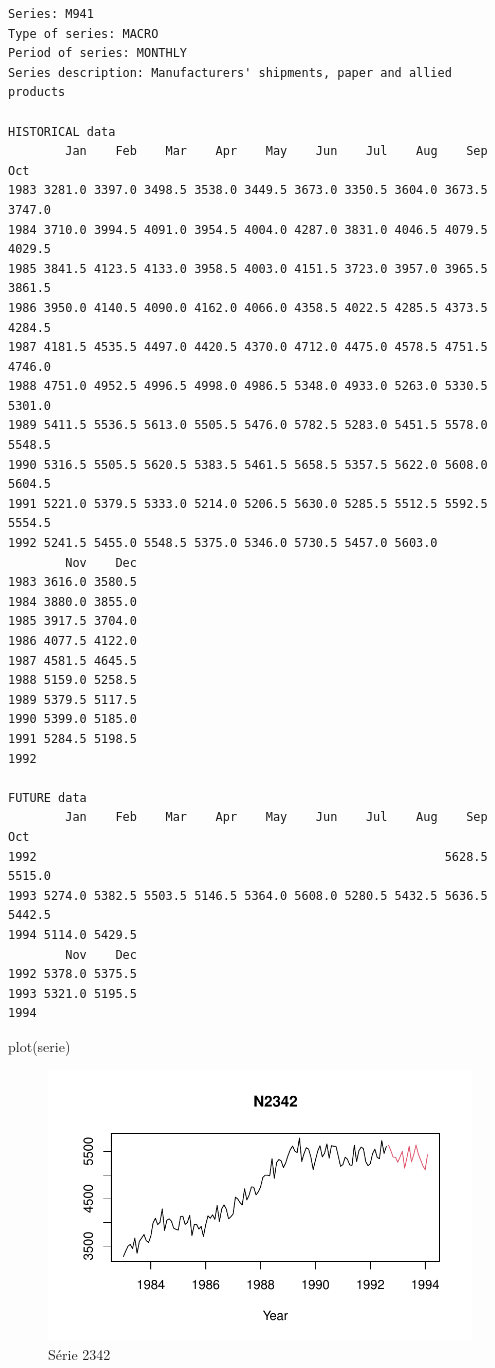 \documentclass[
  letterpaper,
  DIV=11,
  numbers=noendperiod]{scrartcl}
\newenvironment{Shaded}{\begin{snugshade}}{\end{snugshade}}
\newcommand{\FunctionTok}[1]{\textcolor[rgb]{0.28,0.35,0.67}{#1}}
\newcommand{\NormalTok}[1]{\textcolor[rgb]{0.00,0.23,0.31}{#1}}
\begin{document}
\begin{verbatim}
Series: M941
Type of series: MACRO
Period of series: MONTHLY
Series description: Manufacturers' shipments, paper and allied products

HISTORICAL data
        Jan    Feb    Mar    Apr    May    Jun    Jul    Aug    Sep    Oct
1983 3281.0 3397.0 3498.5 3538.0 3449.5 3673.0 3350.5 3604.0 3673.5 3747.0
1984 3710.0 3994.5 4091.0 3954.5 4004.0 4287.0 3831.0 4046.5 4079.5 4029.5
1985 3841.5 4123.5 4133.0 3958.5 4003.0 4151.5 3723.0 3957.0 3965.5 3861.5
1986 3950.0 4140.5 4090.0 4162.0 4066.0 4358.5 4022.5 4285.5 4373.5 4284.5
1987 4181.5 4535.5 4497.0 4420.5 4370.0 4712.0 4475.0 4578.5 4751.5 4746.0
1988 4751.0 4952.5 4996.5 4998.0 4986.5 5348.0 4933.0 5263.0 5330.5 5301.0
1989 5411.5 5536.5 5613.0 5505.5 5476.0 5782.5 5283.0 5451.5 5578.0 5548.5
1990 5316.5 5505.5 5620.5 5383.5 5461.5 5658.5 5357.5 5622.0 5608.0 5604.5
1991 5221.0 5379.5 5333.0 5214.0 5206.5 5630.0 5285.5 5512.5 5592.5 5554.5
1992 5241.5 5455.0 5548.5 5375.0 5346.0 5730.5 5457.0 5603.0              
        Nov    Dec
1983 3616.0 3580.5
1984 3880.0 3855.0
1985 3917.5 3704.0
1986 4077.5 4122.0
1987 4581.5 4645.5
1988 5159.0 5258.5
1989 5379.5 5117.5
1990 5399.0 5185.0
1991 5284.5 5198.5
1992              

FUTURE data
        Jan    Feb    Mar    Apr    May    Jun    Jul    Aug    Sep    Oct
1992                                                         5628.5 5515.0
1993 5274.0 5382.5 5503.5 5146.5 5364.0 5608.0 5280.5 5432.5 5636.5 5442.5
1994 5114.0 5429.5                                                        
        Nov    Dec
1992 5378.0 5375.5
1993 5321.0 5195.5
1994              
\end{verbatim}

\begin{Shaded}
\begin{Highlighting}[]
\FunctionTok{plot}\NormalTok{(serie)}
\end{Highlighting}
\end{Shaded}

\begin{figure}[H]

{\centering \includegraphics{Trabalhao1_ST_grupo5_2023_05_16_files/figure-pdf/figura-1.pdf}

}

\caption{Série 2342}

\end{figure}
\end{document}
